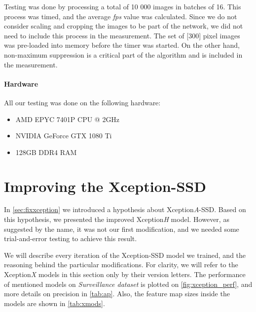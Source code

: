 Testing was done by processing a total of 10 000 images in batches of 16. This process was timed, and the average \textit{fps} value was calculated.  Since we do not consider scaling and cropping the images to be part of the network, we did not need to include this process in the measurement. The set of [300] pixel images was pre-loaded into memory before the timer was started. On the other hand, non-maximum suppression is a critical part of the algorithm and is included in the measurement. 

\paragraph{Hardware} All our testing was done on the following hardware:
\begin{itemize}
    \item AMD EPYC 7401P CPU @ 2GHz 
    \item NVIDIA GeForce GTX 1080 Ti
    \item 128GB DDR4 RAM
\end{itemize}


\section{Improving the Xception-SSD}
In \cref{sec:fixxception} we introduced a hypothesis about Xception\textit{A}-SSD. Based on this hypothesis, we presented the improved Xception\textit{H} model. However, as suggested by the name, it was not our first modification, and we needed some trial-and-error testing to achieve this result.

We will describe every iteration of the Xception-SSD model we trained, and the reasoning behind the particular modifications. For clarity, we will refer to the Xception\textit{X} models in this section only by their version letters. The performance of mentioned models on \textit{Surveillance dataset} is plotted on \cref{fig:xception_perf}, and more details on precision in \cref{tab:ap}. Also, the feature map sizes inside the models are shown in \cref{tab:xmods}.


